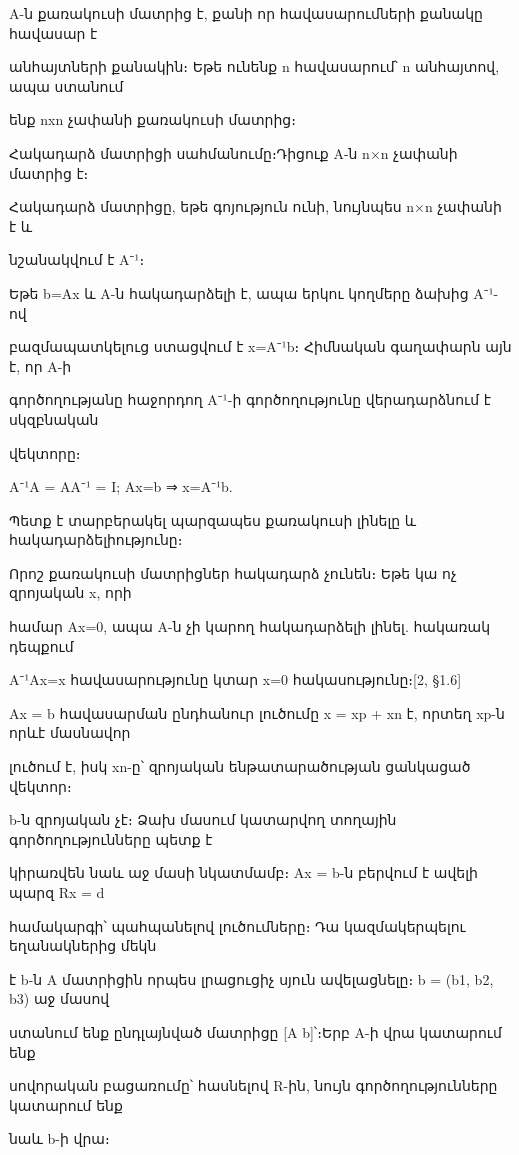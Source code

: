 \documentclass[11pt,a4paper]{article}
\begin{document}
A-ն քառակուսի մատրից է, քանի որ հավասարումների քանակը հավասար է

անհայտների քանակին։ Եթե ունենք n հավասարում՝ n անհայտով, ապա ստանում

ենք nxn չափանի քառակուսի մատրից։




Հակադարձ մատրիցի սահմանումը։Դիցուք A-ն n×n չափանի մատրից է։

Հակադարձ մատրիցը, եթե գոյություն ունի, նույնպես n×n չափանի է և

նշանակվում է A⁻¹։




Եթե b=Ax և A-ն հակադարձելի է, ապա երկու կողմերը ձախից A⁻¹-ով

բազմապատկելուց ստացվում է x=A⁻¹b։ Հիմնական գաղափարն այն է, որ A-ի

գործողությանը հաջորդող A⁻¹-ի գործողությունը վերադարձնում է սկզբնական




վեկտորը։

A⁻¹A = AA⁻¹ = I; Ax=b ⇒ x=A⁻¹b.




Պետք է տարբերակել պարզապես քառակուսի լինելը և հակադարձելիությունը։

Որոշ քառակուսի մատրիցներ հակադարձ չունեն։ Եթե կա ոչ զրոյական x, որի

համար Ax=0, ապա A-ն չի կարող հակադարձելի լինել. հակառակ դեպքում

A⁻¹Ax=x հավասարությունը կտար x=0 հակասությունը։[2, §1.6]




Ax = b հավասարման ընդհանուր լուծումը x = xp + xn է, որտեղ xp-ն որևէ մասնավոր

լուծում է, իսկ xn-ը՝ զրոյական ենթատարածության ցանկացած վեկտոր։

b-ն զրոյական չէ։ Ձախ մասում կատարվող տողային գործողությունները պետք է

կիրառվեն նաև աջ մասի նկատմամբ։ Ax = b-ն բերվում է ավելի պարզ Rx = d

համակարգի՝ պահպանելով լուծումները։ Դա կազմակերպելու եղանակներից մեկն

է b-ն A մատրիցին որպես լրացուցիչ սյուն ավելացնելը։ b = (b1, b2, b3) աջ մասով

ստանում ենք ընդլայնված մատրիցը [A b]՝։Երբ A-ի վրա կատարում ենք

սովորական բացառումը՝ հասնելով R-ին, նույն գործողությունները կատարում ենք

նաև b-ի վրա։
\end{document}
